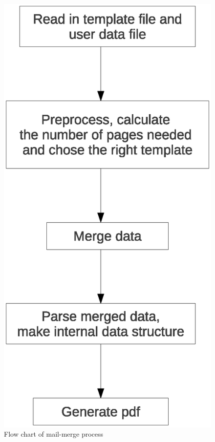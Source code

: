 \documentclass{report}
\begin{document}
\begin{figure}[p]
\centering
\includegraphics[scale=0.5]{mailmergeprocess.eps}
\caption{Flow chart of mail-merge process}
\label{fig2}
\end{figure}
\end{document}
